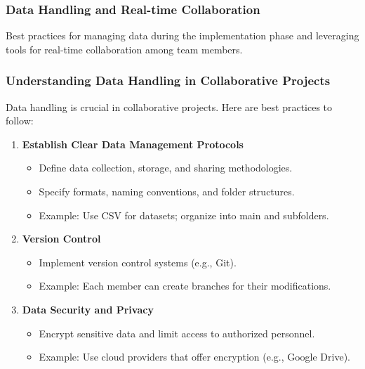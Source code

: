 \documentclass[aspectratio=169]{beamer}
\begin{document}
\begin{frame}[fragile]
    \frametitle{Data Handling and Real-time Collaboration}
    Best practices for managing data during the implementation phase and leveraging tools for real-time collaboration among team members.
\end{frame}

\begin{frame}[fragile]
    \frametitle{Understanding Data Handling in Collaborative Projects}
    Data handling is crucial in collaborative projects. Here are best practices to follow:
    
    \begin{enumerate}
        \item \textbf{Establish Clear Data Management Protocols}
        \begin{itemize}
            \item Define data collection, storage, and sharing methodologies.
            \item Specify formats, naming conventions, and folder structures.
            \item Example: Use CSV for datasets; organize into main and subfolders.
        \end{itemize}
        
        \item \textbf{Version Control}
        \begin{itemize}
            \item Implement version control systems (e.g., Git).
            \item Example: Each member can create branches for their modifications.
        \end{itemize}
        
        \item \textbf{Data Security and Privacy}
        \begin{itemize}
            \item Encrypt sensitive data and limit access to authorized personnel.
            \item Example: Use cloud providers that offer encryption (e.g., Google Drive).
        \end{itemize}
    \end{enumerate}
\end{frame}
\end{document}
